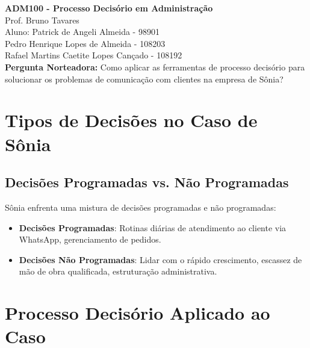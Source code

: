 \documentclass[11pt]{article}
\begin{document}
\begin{center}
    \textbf{ADM100 - Processo Decisório em Administração} \\
    Prof. Bruno Tavares \\
    Aluno: Patrick de Angeli Almeida - 98901 \\
    Pedro Henrique Lopes de Almeida - 108203 \\
    Rafael Martins Caetite Lopes Cançado - 108192  \\
    \vspace{1cm}
    \textbf{Pergunta Norteadora:} Como aplicar as ferramentas de processo decisório para solucionar os problemas de comunicação com clientes na empresa de Sônia?
\end{center}

\section{Tipos de Decisões no Caso de Sônia}

\subsection{Decisões Programadas vs. Não Programadas}

Sônia enfrenta uma mistura de decisões programadas e não programadas:

\begin{itemize}
    \item \textbf{Decisões Programadas}: Rotinas diárias de atendimento ao cliente via WhatsApp, gerenciamento de pedidos.
    \item \textbf{Decisões Não Programadas}: Lidar com o rápido crescimento, escassez de mão de obra qualificada, estruturação administrativa.
\end{itemize}

\section{Processo Decisório Aplicado ao Caso}
\end{document}

